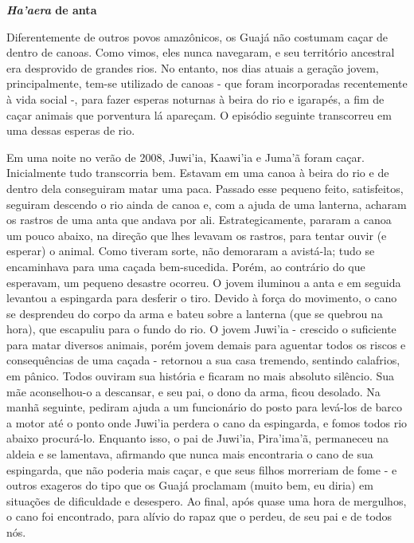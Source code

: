\textbf{\emph{Ha'aera} de anta}

Diferentemente de outros povos amazônicos, os Guajá não costumam caçar
de dentro de canoas. Como vimos, eles nunca navegaram, e seu território
ancestral era desprovido de grandes rios. No entanto, nos dias atuais a
geração jovem, principalmente, tem-se utilizado de canoas - que foram
incorporadas recentemente à vida social -, para fazer esperas noturnas à
beira do rio e igarapés, a fim de caçar animais que porventura lá
apareçam. O episódio seguinte transcorreu em uma dessas esperas de rio.

Em uma noite no verão de 2008, Juwi'ia, Kaawi'ia e Juma'ã foram caçar.
Inicialmente tudo transcorria bem. Estavam em uma canoa à beira do rio e
de dentro dela conseguiram matar uma paca. Passado esse pequeno feito,
satisfeitos, seguiram descendo o rio ainda de canoa e, com a ajuda de
uma lanterna, acharam os rastros de uma anta que andava por ali.
Estrategicamente, pararam a canoa um pouco abaixo, na direção que lhes
levavam os rastros, para tentar ouvir (e esperar) o animal. Como tiveram
sorte, não demoraram a avistá-la; tudo se encaminhava para uma caçada
bem-sucedida. Porém, ao contrário do que esperavam, um pequeno desastre
ocorreu. O jovem iluminou a anta e em seguida levantou a espingarda para
desferir o tiro. Devido à força do movimento, o cano se desprendeu do
corpo da arma e bateu sobre a lanterna (que se quebrou na hora), que
escapuliu para o fundo do rio. O jovem Juwi'ia - crescido o suficiente
para matar diversos animais, porém jovem demais para aguentar todos os
riscos e consequências de uma caçada - retornou a sua casa tremendo,
sentindo calafrios, em pânico. Todos ouviram sua história e ficaram no
mais absoluto silêncio. Sua mãe aconselhou-o a descansar, e seu pai, o
dono da arma, ficou desolado. Na manhã seguinte, pediram ajuda a um
funcionário do posto para levá-los de barco a motor até o ponto onde
Juwi'ia perdera o cano da espingarda, e fomos todos rio abaixo
procurá-lo. Enquanto isso, o pai de Juwi'ia, Pira'ima'ã, permaneceu na
aldeia e se lamentava, afirmando que nunca mais encontraria o cano de
sua espingarda, que não poderia mais caçar, e que seus filhos morreriam
de fome - e outros exageros do tipo que os Guajá proclamam (muito bem,
eu diria) em situações de dificuldade e desespero. Ao final, após quase
uma hora de mergulhos, o cano foi encontrado, para alívio do rapaz que o
perdeu, de seu pai e de todos nós.

